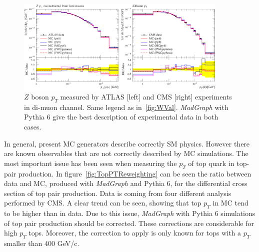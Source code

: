 \begin{figure}[!Hhtbp]
  \begin{center}
    \includegraphics[width=0.9\textwidth]{figs/Zpt_rivet.png}
    \caption{$Z$ boson $p_{T}$ measured by ATLAS [left] and CMS [right] experiments in di-muon channel. Same legend as in~\ref{fig:WVal}. \textit{MadGraph} with Pythia 6 give the best description of experimental data in both cases.}
    \label{fig:ZVal}
  \end{center}
\end{figure}

In general, present MC generators describe correctly SM physics. However there are known observables that are not correctly described by MC simulations. The most important issue has been seen when measuring the $p_{T}$ of top quark in top-pair production. In figure~\ref{fig:TopPTReweighting} can be seen the ratio between data and MC, produced with \textit{MadGraph} and Pythia 6, for the differential cross section of top pair production. Data is coming from four different analysis performed by CMS. A clear trend can be seen, showing that top $p_{T}$ in MC tend to be higher than in data. Due to this issue, \textit{MadGraph} with Pythia 6 simulations of top pair production should be corrected. These corrections are considerable for high $p_{T}$ tops. Moreover, the correction to apply is only known for tops with a $p_{T}$ smaller than 400 GeV/c.

